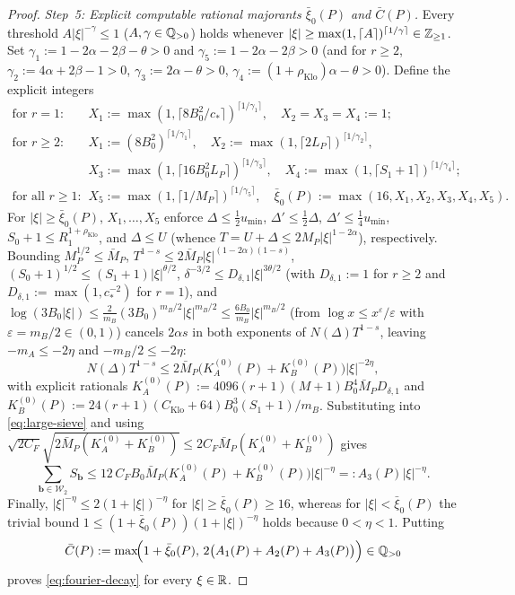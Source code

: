 \documentclass[11pt]{article}
\newcommand{\rhoK}{\rho_{\mathrm{Klo}}}
\newcommand{\CK}{C_{\mathrm{Klo}}}
\begin{document}
\begin{proof}
\emph{Step~5: Explicit computable rational majorants $\bar\xi_0(P)$ and $\bar C(P)$.}
Every threshold $A|\xi|^{-\gamma}\le1$ ($A,\gamma\in\mathbb Q_{>0}$) holds whenever $|\xi|\ge\max(1,\lceil A\rceil)^{\lceil1/\gamma\rceil}\in\mathbb Z_{\ge1}$. Set $\gamma_1:=1-2\alpha-2\beta-\theta>0$ and $\gamma_5:=1-2\alpha-2\beta>0$ (and for $r\ge2$, $\gamma_2:=4\alpha+2\beta-1>0$, $\gamma_3:=2\alpha-\theta>0$, $\gamma_4:=(1+\rhoK)\alpha-\theta>0$). Define the explicit integers
\begin{align*}
\text{for }r=1:&\quad X_1:=\max(1,\lceil 8B_0^2/c_*\rceil)^{\lceil1/\gamma_1\rceil},\quad X_2=X_3=X_4:=1;\\
\text{for }r\ge2:&\quad X_1:=(8B_0^2)^{\lceil1/\gamma_1\rceil},\quad X_2:=\max(1,\lceil 2L_P\rceil)^{\lceil1/\gamma_2\rceil},\\
&\quad X_3:=\max(1,\lceil 16B_0^2L_P\rceil)^{\lceil1/\gamma_3\rceil},\quad X_4:=\max(1,\lceil S_1+1\rceil)^{\lceil1/\gamma_4\rceil};\\
\text{for all }r\ge1:&\quad X_5:=\max(1,\lceil 1/M_P\rceil)^{\lceil1/\gamma_5\rceil},\quad \bar\xi_0(P):=\max(16,X_1,X_2,X_3,X_4,X_5).
\end{align*}
For $|\xi|\ge\bar\xi_0(P)$, $X_1,\dots,X_5$ enforce $\Delta\le\frac12 u_{\min}$, $\Delta'\le\frac12\Delta$, $\Delta'\le\frac14 u_{\min}$, $S_0+1\le R_1^{1+\rhoK}$, and $\Delta\le U$ (whence $T=U+\Delta\le 2M_P|\xi|^{1-2\alpha}$), respectively. Bounding $M_P^{1/2}\le\bar M_P$, $T^{1-s}\le 2\bar M_P|\xi|^{(1-2\alpha)(1-s)}$, $(S_0+1)^{1/2}\le(S_1+1)|\xi|^{\theta/2}$, $\delta^{-3/2}\le D_{\delta,1}|\xi|^{3\theta/2}$ (with $D_{\delta,1}:=1$ for $r\ge2$ and $D_{\delta,1}:=\max(1,c_*^{-2})$ for $r=1$), and $\log(3B_0|\xi|)\le\frac{2}{m_B}(3B_0)^{m_B/2}|\xi|^{m_B/2}\le\frac{6B_0}{m_B}|\xi|^{m_B/2}$ (from $\log x\le x^\varepsilon/\varepsilon$ with $\varepsilon=m_B/2\in(0,1)$) cancels $2\alpha s$ in both exponents of $N(\Delta)T^{1-s}$, leaving $-m_A\le-2\eta$ and $-m_B/2\le-2\eta$:
\[
N(\Delta)T^{1-s}\le 2\bar M_P\bigl(K_A^{(0)}(P)+K_B^{(0)}(P)\bigr)|\xi|^{-2\eta},
\]
with explicit rationals $K_A^{(0)}(P):=4096(r+1)(M+1)B_0^4\bar M_P D_{\delta,1}$ and $K_B^{(0)}(P):=24(r+1)(\CK+64)B_0^3(S_1+1)/m_B$. Substituting into \eqref{eq:large-sieve} and using $\sqrt{2C_F}\sqrt{2\bar M_P(K_A^{(0)}+K_B^{(0)})}\le 2C_F\bar M_P(K_A^{(0)}+K_B^{(0)})$ gives
\[
\sum_{\mathbf{b}\in\mathcal{W}_2}S_{\mathbf{b}}\le 12\,C_FB_0\bar M_P\bigl(K_A^{(0)}(P)+K_B^{(0)}(P)\bigr)|\xi|^{-\eta}=:A_3(P)|\xi|^{-\eta}.
\]
Finally, $|\xi|^{-\eta}\le 2(1+|\xi|)^{-\eta}$ for $|\xi|\ge\bar\xi_0(P)\ge16$, whereas for $|\xi|<\bar\xi_0(P)$ the trivial bound $1\le(1+\bar\xi_0(P))(1+|\xi|)^{-\eta}$ holds because $0<\eta<1$. Putting
\[
\bar C(P):=\max\!\Bigl(1+\bar\xi_0(P),\,2\bigl(A_1(P)+A_2(P)+A_3(P)\bigr)\Bigr)\in\mathbb Q_{>0}
\]
proves \eqref{eq:fourier-decay} for every $\xi\in\mathbb R$.
\end{proof}
\end{document}
